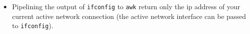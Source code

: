 \documentclass{article}
\begin{document}
\begin{itemize}
AQ: value Temp: value $\rm^\circ C$ (e.g. AQ: 55 Temp: 24 $\rm^\circ C$).

\begin{verbatim}
curl --silent 'http://aqicn.org/?city=Shanghai&widgetscript&size=large' \
| sed ':t;N;s/\n//;b t' \
| sed 's/\([^\n]\+\)\\\">/AQ: /g' \
| sed "s/<\/div>\([^\n]\+\)10px;'>/ Temp: /g" \
| sed 's/<\/td>\([^\n]\+\)//g' \
&& echo -e '\u00B0C'
\end{verbatim}

\item Pipelining the output of \texttt{ifconfig} to \texttt{awk} return only the ip address of your current active network connection (the active network interface can be passed to \texttt{ifconfig}).


\end{itemize}
\end{document}
